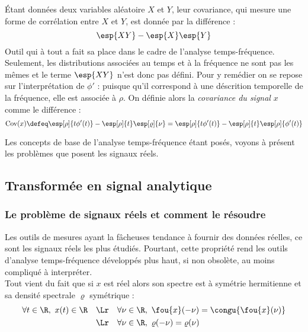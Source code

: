 \begin{definition}[Covariance]\label{def:cova_signal}
	Étant données deux variables aléatoire $X$ et $Y$, leur covariance, qui mesure une forme de corrélation entre $X$ et $Y$, est donnée par la différence :
	\[\esp{XY}-\esp{X}\esp{Y}\]
	Outil qui à tout a fait sa place dans le cadre de l'analyse temps-fréquence. Seulement, les distributions associées au temps et à la fréquence ne sont pas les mêmes et le terme $\esp{XY}$ n'est donc pas défini.
	Pour y remédier on se repose sur l'interprétation de $\phi'$ : puisque qu'il correspond à une déscrition temporelle de la fréquence, elle est associée à $\rho$. On définie alors la \emph{covariance du signal} $x$ comme le différence :
	\begin{equation}\label{eq:cov_signal}
		\text{Cov}(x) \defeq \esp[\rho]{t\phi'(t)} - \esp[\rho]{t} \esp[\varrho]{\nu} = \esp[\rho]{t\phi'(t)} - \esp[\rho]{t} \esp[\rho]{\phi'(t)}
	\end{equation}
\end{definition}

Les concepts de base de l'analyse temps-fréquence étant posés, voyons à présent les problèmes que posent les signaux réels.



\subsection{Transformée en signal analytique}

\subsubsection{Le problème de signaux réels et comment le résoudre}\label{subsec:transfo_SA}


Les outils de mesures ayant la fâcheuses tendance à fournir des données réelles, ce sont les signaux réels les plus étudiés.
Pourtant, cette propriété rend les outils d'analyse temps-fréquence développés plus haut, si non obsolète, au moins compliqué à interpréter.
\\
Tout vient du fait que si $x$ est réel alors son spectre est à symétrie hermitienne et sa densité spectrale $\varrho$ symétrique :
\begin{align*}
\forall t\in\R,\ x(t)\in\R \quad &\Lr \quad \forall \nu\in\R,\ \fou{x}(-\nu) = \congu{\fou{x}(\nu)} \\
	&\Lr \quad \forall \nu\in\R,\ \varrho(-\nu) = \varrho(\nu)
\end{align*}
\\

